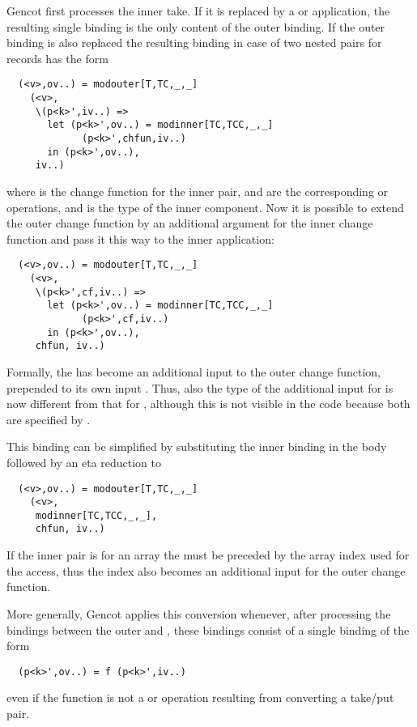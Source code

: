 Gencot first processes the inner take. If it is replaced by a  or  application, the resulting single
binding is the only content of the outer binding. If the outer binding is also replaced the resulting binding in case of two
nested pairs for records has the form
\begin{verbatim}
  (<v>,ov..) = modouter[T,TC,_,_]
    (<v>,
     \(p<k>',iv..) =>
       let (p<k>',ov..) = modinner[TC,TCC,_,_]
             (p<k>',chfun,iv..)
       in (p<k>',ov..),
     iv..)
\end{verbatim}
where  is the change function for the inner pair,  and  are the corresponding
 or  operations, and  is the type of the inner component. Now it is possible
to extend the outer change function by an additional argument for the inner change function and pass it this way to
the inner application:
\begin{verbatim}
  (<v>,ov..) = modouter[T,TC,_,_]
    (<v>,
     \(p<k>',cf,iv..) =>
       let (p<k>',ov..) = modinner[TC,TCC,_,_]
             (p<k>',cf,iv..)
       in (p<k>',ov..),
     chfun, iv..)
\end{verbatim}
Formally, the  has become an additional input to the outer change function, prepended to its own input
. Thus, also the type of the additional input for  is now different from that for ,
although this is not visible in the code because both are specified by \code{\_}.

This binding
can be simplified by substituting the inner binding in the  body followed by an eta reduction to
\begin{verbatim}
  (<v>,ov..) = modouter[T,TC,_,_]
    (<v>,
     modinner[TC,TCC,_,_],
     chfun, iv..)
\end{verbatim}

If the inner pair is for an array the  must be preceded by the array index used for the access, thus the
index also becomes an additional input for the outer change function.

More generally, Gencot applies this conversion whenever, after processing the bindings between the outer 
and , these bindings consist of a single binding of the form
\begin{verbatim}
  (p<k>',ov..) = f (p<k>',iv..)
\end{verbatim}
even if the function  is not a  or  operation resulting from converting a take/put
pair.

